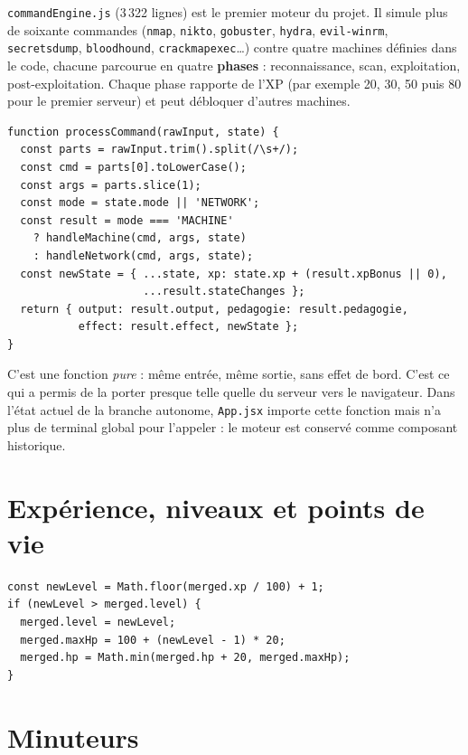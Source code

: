 \documentclass[11pt,a4paper]{report}
\newcommand{\file}[1]{\texttt{\nolinkurl{#1}}}
\begin{document}
\file{commandEngine.js} (3\,322 lignes) est le premier moteur du projet. Il simule plus
de soixante commandes (\texttt{nmap}, \texttt{nikto}, \texttt{gobuster}, \texttt{hydra},
\texttt{evil-winrm}, \texttt{secretsdump}, \texttt{bloodhound}, \texttt{crackmapexec}\ldots) contre quatre machines d\'efinies dans le code, chacune
parcourue en quatre \textbf{phases} : reconnaissance, scan, exploitation,
post-exploitation. Chaque phase rapporte de l'XP (par exemple 20, 30, 50 puis 80 pour le
premier serveur) et peut d\'ebloquer d'autres machines.

\begin{lstlisting}[style=js,caption={Point d'entr\'ee du moteur (\file{commandEngine.js})}]
function processCommand(rawInput, state) {
  const parts = rawInput.trim().split(/\s+/);
  const cmd = parts[0].toLowerCase();
  const args = parts.slice(1);
  const mode = state.mode || 'NETWORK';
  const result = mode === 'MACHINE'
    ? handleMachine(cmd, args, state)
    : handleNetwork(cmd, args, state);
  const newState = { ...state, xp: state.xp + (result.xpBonus || 0),
                     ...result.stateChanges };
  return { output: result.output, pedagogie: result.pedagogie,
           effect: result.effect, newState };
}
\end{lstlisting}

C'est une fonction \emph{pure} : m\^eme entr\'ee, m\^eme sortie, sans effet de bord. C'est
ce qui a permis de la porter presque telle quelle du serveur vers le navigateur.
Dans l'\'etat actuel de la branche autonome, \file{App.jsx} importe cette fonction mais
n'a plus de terminal global pour l'appeler : le moteur est conserv\'e comme composant
historique.

\section{Exp\'erience, niveaux et points de vie}

\begin{lstlisting}[style=js,caption={Passage de niveau (\file{gameState.js})}]
const newLevel = Math.floor(merged.xp / 100) + 1;
if (newLevel > merged.level) {
  merged.level = newLevel;
  merged.maxHp = 100 + (newLevel - 1) * 20;
  merged.hp = Math.min(merged.hp + 20, merged.maxHp);
}
\end{lstlisting}

\section{Minuteurs}
\end{document}
